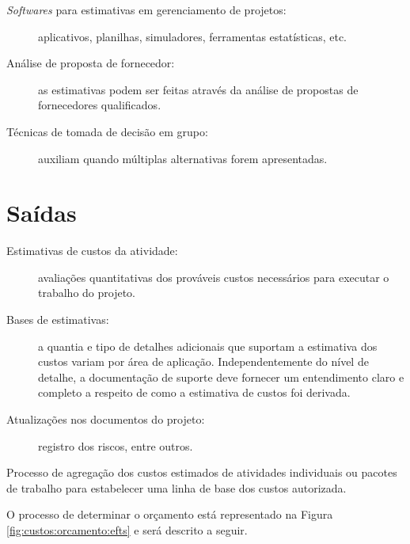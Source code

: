 \begin{description}
	\item[\textit{Softwares} para estimativas em gerenciamento de projetos:] aplicativos, planilhas, simuladores, ferramentas estatísticas, etc.
	
	\item[Análise de proposta de fornecedor:] as estimativas podem ser feitas através da análise de propostas de fornecedores qualificados.
	
	\item[Técnicas de tomada de decisão em grupo:] auxiliam quando múltiplas alternativas forem apresentadas.
	
		
\end{description}

\section{Saídas}

\begin{description}
	
	\item[Estimativas de custos da atividade:] avaliações quantitativas dos prováveis custos necessários para executar o trabalho do projeto.
	
	\item[Bases de estimativas:] a quantia e tipo de detalhes adicionais que suportam a estimativa dos custos variam por área de aplicação. Independentemente do nível de detalhe, a documentação de suporte deve fornecer um entendimento claro e completo a respeito de como a estimativa de custos foi derivada.

	\item[Atualizações nos documentos do projeto:] registro dos riscos, entre outros.

\end{description}


Processo de agregação dos custos estimados de atividades individuais ou pacotes de trabalho para estabelecer uma linha de base dos custos autorizada. 

O processo de determinar o orçamento está representado na Figura \ref{fig:custos:orcamento:efts} e será descrito a seguir.

